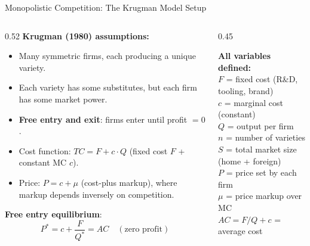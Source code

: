 \documentclass[aspectratio=169]{beamer}
\begin{document}
\begin{frame}{Monopolistic Competition: The Krugman Model Setup}
\begin{columns}
\begin{column}{0.52\textwidth}
\textbf{Krugman (1980) assumptions:}
\begin{itemize}
  \item Many symmetric firms, each producing a unique variety.
  \item Each variety has some substitutes, but each firm has some market power.
  \item \textbf{Free entry and exit}: firms enter until profit $= 0$.
  \item Cost function: $TC = F + c \cdot Q$ (fixed cost $F$ + constant MC $c$).
  \item Price: $P = c + \mu$ (cost-plus markup), where markup depends inversely on competition.
\end{itemize}
\vspace{0.2em}
\textbf{Free entry equilibrium}:
\[P^* = c + \frac{F}{Q^*} = AC \quad(\text{zero profit})\]
\end{column}
\begin{column}{0.45\textwidth}
\begin{varbox}
\small\textbf{All variables defined:}\\
$F$ = fixed cost (R\&D, tooling, brand)\\
$c$ = marginal cost (constant)\\
$Q$ = output per firm\\
$n$ = number of varieties\\
$S$ = total market size (home + foreign)\\
$P$ = price set by each firm\\
$\mu$ = price markup over MC\\
$AC = F/Q + c$ = average cost
\end{varbox}
\end{column}
\end{columns}
\end{frame}
\end{document}
